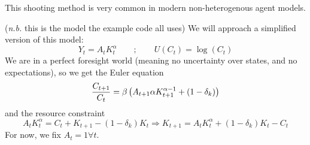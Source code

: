 \documentclass[10pt]{article}
\begin{document}
\begin{remark}
	This shooting method is very common in modern non-heterogenous agent models.
\end{remark}
\begin{model}
	 (\emph{n.b.} this is the model the example code all uses) We will approach a simplified version of this model:
	\[
	Y_t = A_tK_t^\alpha\qquad ; \qquad U(C_t) = \log(C_t)
	\]
	We are in a perfect foresight world (meaning no uncertainty over states, and no expectations), so we get the Euler equation
	\[
	\frac{C_{t+1}}{C_t} = \beta \left( A_{t+1} \alpha K_{t+1}^{\alpha - 1} + (1-\delta_k)\right)
	\]
	and the resource constraint
	\[
	A_tK_t^\alpha = C_t + K_{t+1} - (1-\delta_k)K_t \Longrightarrow K_{t+1} = A_tK_t^\alpha + (1-\delta_k)K_t - C_t
	\]
	For now, we fix $A_t = 1 \forall t$.
\end{model}
\end{document}
